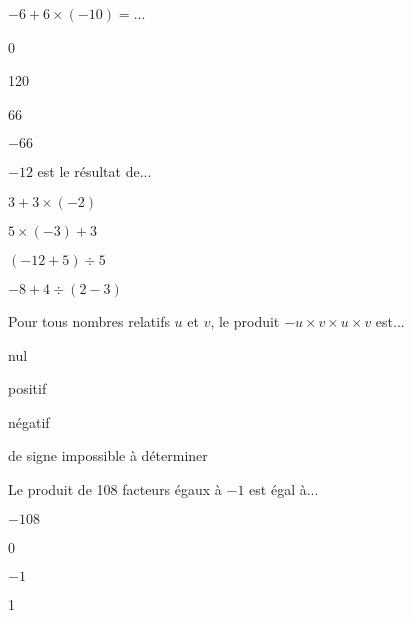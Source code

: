 \begin{QCM}
\begin{GroupeQCM}
\begin{exercice}
$-6 + 6 \times (-10) =$...
\begin{ChoixQCM}{4}
\item 0
\item 120
\item 66
\item $-66$
\end{ChoixQCM}
\begin{corrige}
\end{corrige}
\end{exercice}


\begin{exercice}
$-12$ est le résultat de...
\begin{ChoixQCM}{4}
\item $3 + 3 \times (-2)$
\item $5 \times (-3) + 3$
\item $(-12 + 5) \div 5$
\item $-8 + 4 \div (2 -3)$
\end{ChoixQCM}
\begin{corrige}
\end{corrige}
\end{exercice}




\begin{exercice}
Pour tous nombres relatifs $u$ et $v$, le produit $-u \times v \times u \times v$ est...
\begin{ChoixQCM}{4}
\item nul
\item positif
\item négatif
\item de signe  impossible à déterminer
\end{ChoixQCM}
\begin{corrige}
\end{corrige}
\end{exercice}






\begin{exercice}
Le produit de 108 facteurs égaux à $-1$ est égal à...
\begin{ChoixQCM}{4}
\item $-108$
\item 0
\item $-1$
\item 1
\end{ChoixQCM}
\begin{corrige}
\end{corrige}
\end{exercice}
\end{GroupeQCM}
\end{QCM}



